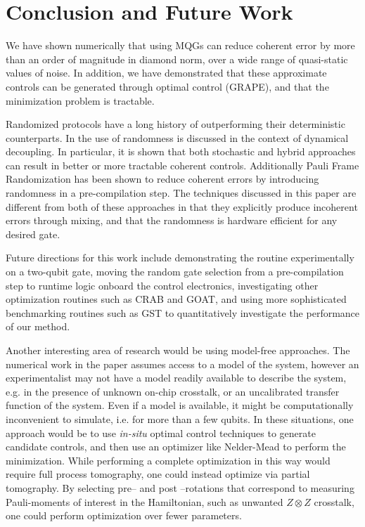 \documentclass[aps,nofootinbib,pra,notitlepage,twocolumn]{revtex4-1}
\begin{document}
\section{Conclusion and Future Work}
We have shown numerically that using MQGs can reduce coherent error by more than an order of magnitude in diamond norm, over a wide range of quasi-static values of noise. In addition, we have demonstrated that these approximate controls can be generated through optimal control (GRAPE), and that the minimization problem is tractable.

Randomized protocols have a long history of outperforming their deterministic counterparts. In \cite{Viola2005, Santos2006} the use of randomness is discussed in the context of dynamical decoupling. In particular, it is shown that both stochastic and hybrid approaches can result in better or more tractable coherent controls. Additionally Pauli Frame Randomization\cite{Wallman2016} has been shown \cite{1803.01818} to reduce coherent errors by introducing randomness in a pre-compilation step. The techniques discussed in this paper are different from both of these approaches in that they explicitly produce incoherent errors through mixing, and that the randomness is hardware efficient for any desired gate.

Future directions for this work include demonstrating the routine experimentally on a two-qubit gate, moving the random gate selection from a pre-compilation step to runtime logic onboard the control electronics, investigating other optimization routines such as CRAB \cite{Caneva2011} and GOAT\cite{Machnes2018}, and using more sophisticated benchmarking routines such as GST\cite{BlumeKohout2017} to quantitatively investigate the performance of our method.

Another interesting area of research would be using model-free approaches. The numerical work in the paper assumes access to a model of the system, however an experimentalist may not have a model readily available to describe the system, e.g. in the presence of unknown on-chip crosstalk, or an uncalibrated transfer function of the system. Even if a model is available, it might be computationally inconvenient to simulate, i.e. for more than a few qubits. In these situations, one approach would be to use \textit{in-situ} optimal control techniques \cite{Wu2018, Kelly2014, Ferrie2015} to generate candidate controls, and then use an optimizer like Nelder-Mead to perform the minimization. While performing a complete optimization in this way would require full process tomography, one could instead optimize via partial tomography. By selecting pre-- and post --rotations that correspond to measuring Pauli-moments of interest in the Hamiltonian, such as unwanted $Z\otimes Z$ crosstalk, one could perform optimization over fewer parameters.
\end{document}
